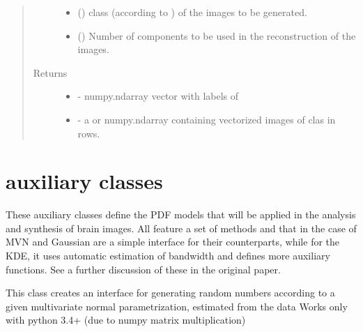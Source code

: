 \documentclass[letterpaper,10pt,english]{sphinxmanual}
\begin{document}
\begin{fulllineitems}
\begin{fulllineitems}
\begin{quote}
\begin{description}
\begin{itemize}
\item {} 
 () \textendash{} class (according to ) of the images to         be generated.

\item {} 
 () \textendash{} Number of components to be used in the         reconstruction of the images.

\end{itemize}

\item[{Returns}] \leavevmode
\begin{itemize}
\item {} 
 - numpy.ndarray vector with  labels of 

\item {} 
 - a  or numpy.ndarray containing              vectorized images of clas  in rows.

\end{itemize}


\end{description}\end{quote}

\end{fulllineitems}


\end{fulllineitems}



\section{auxiliary classes}
\label{\detokenize{api:auxiliary-classes}}
These auxiliary classes define the PDF models that will be applied in the analysis and synthesis of brain images. All feature a set of methods  and  that in the case of MVN and Gaussian are a simple interface for their  counterparts, while for the KDE, it uses automatic estimation of bandwidth and defines more auxiliary functions. See a further discussion of these in the original paper.

\begin{fulllineitems}
\label{\detokenize{api:brainSimulator.MVNormalEstimator}}
This class creates an interface for generating random numbers according
to a given multivariate normal parametrization, estimated from the data
Works only with python 3.4+ (due to numpy matrix multiplication)

\end{fulllineitems}
\end{document}
